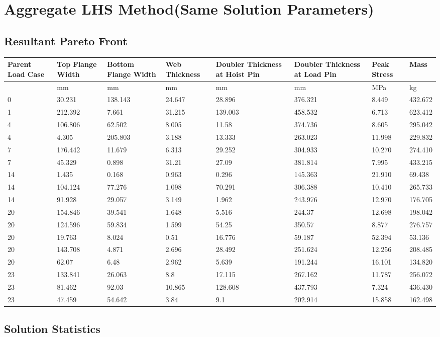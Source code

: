 \section{Aggregate LHS Method(Same Solution Parameters)}
\subsection{Resultant Pareto Front}
\small
\begin{tabular}{|p{1.5cm}p{1.5cm}p{1.5cm}p{1.4cm}p{2cm}p{2cm}p{1.5cm}p{1.5cm}|}
\hline
Parent Load Case&Top Flange Width&Bottom Flange Width&Web Thickness&Doubler Thickness at Hoist Pin&Doubler Thickness at Load Pin&Peak Stress& Mass\\
\hline
&mm&mm&mm&mm&mm&MPa&kg\\
\hline
0&30.231&138.143&24.647&28.896&376.321&8.449&432.672\\
1&212.392&7.661&31.215&139.003&458.532&6.713&623.412\\
4&106.806&62.502&8.005&11.58&374.736&8.605&295.042\\
4&4.305&205.803&3.188&13.333&263.023&11.998&229.832\\
7&176.442&11.679&6.313&29.252&304.933&10.270&274.410\\
7&45.329&0.898&31.21&27.09&381.814&7.995&433.215\\
14&1.435&0.168&0.963&0.296&145.363&21.910&69.438\\
14&104.124&77.276&1.098&70.291&306.388&10.410&265.733\\
14&91.928&29.057&3.149&1.962&243.976&12.970&176.705\\
20&154.846&39.541&1.648&5.516&244.37&12.698&198.042\\
20&124.596&59.834&1.599&54.25&350.57&8.877&276.757\\
20&19.763&8.024&0.51&16.776&59.187&52.394&53.136\\
20&143.708&4.871&2.696&28.492&251.624&12.256&208.485\\
20&62.07&6.48&2.962&5.639&191.244&16.101&134.820\\
23&133.841&26.063&8.8&17.115&267.162&11.787&256.072\\
23&81.462&92.03&10.865&128.608&437.793&7.324&436.430\\
23&47.459&54.642&3.84&9.1&202.914&15.858&162.498\\
\hline
\end{tabular}
\normalsize
\subsection{Solution Statistics}
